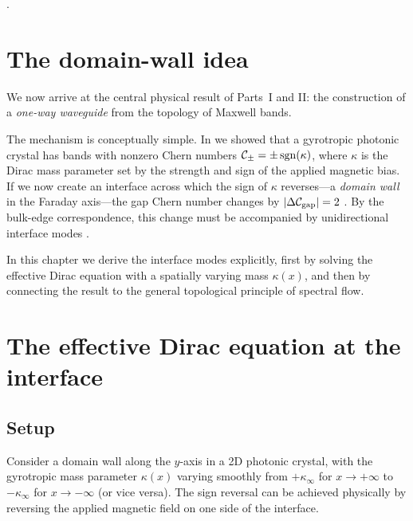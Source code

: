 \cite{haldane2008reflection}.

\section{The domain-wall idea}
\label{sec:ch8-domain-wall-idea}

We now arrive at the central physical result of Parts~I and II: the
construction of a \emph{one-way waveguide} from the topology of
Maxwell bands.

The mechanism is conceptually simple.  In  we
showed that a gyrotropic photonic crystal has bands with nonzero Chern
numbers $\mathcal{C}_\pm=\pm\operatorname{sgn}(\kappa)$, where $\kappa$ is the Dirac mass
parameter set by the strength and sign of the applied magnetic bias.
If we now create an interface across which the sign of $\kappa$
reverses---a \emph{domain wall} in the Faraday axis---the gap Chern
number changes by $|\Delta\mathcal{C}_{\mathrm{gap}}|=2$ \cite{gao2017topologically}.  By the
bulk-edge correspondence, this change must be accompanied by
unidirectional interface modes \cite{hafezi2013imaging}.

In this chapter we derive the interface modes explicitly, first by
solving the effective Dirac equation with a spatially varying mass
$\kappa(x)$, and then by connecting the result to the general
topological principle of spectral flow.

\section{The effective Dirac equation at the interface}
\label{sec:ch8-effective-dirac}

\subsection{Setup}
\label{sec:ch8-setup}

Consider a domain wall along the $y$-axis in a 2D photonic crystal,
with the gyrotropic mass parameter $\kappa(x)$ varying smoothly from
$+\kappa_\infty$ for $x\to+\infty$ to $-\kappa_\infty$ for
$x\to-\infty$ (or vice versa).  The sign reversal can be achieved
physically by reversing the applied magnetic field on one side of the
interface.

